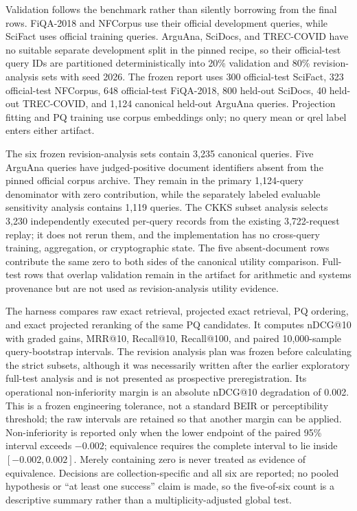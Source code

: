 \documentclass[pdflatex,sn-basic,Numbered]{sn-jnl}
\theoremstyle{plain}
\begin{document}
Validation follows the benchmark rather than silently borrowing from the final rows. FiQA-2018 and NFCorpus use their official development queries, while SciFact uses official training queries. ArguAna, SciDocs, and TREC-COVID have no suitable separate development split in the pinned recipe, so their official-test query IDs are partitioned deterministically into 20\% validation and 80\% revision-analysis sets with seed 2026. The frozen report uses 300 official-test SciFact, 323 official-test NFCorpus, 648 official-test FiQA-2018, 800 held-out SciDocs, 40 held-out TREC-COVID, and 1,124 canonical held-out ArguAna queries. Projection fitting and PQ training use corpus embeddings only; no query mean or qrel label enters either artifact.

The six frozen revision-analysis sets contain 3,235 canonical queries. Five ArguAna queries have judged-positive document identifiers absent from the pinned official corpus archive. They remain in the primary 1,124-query denominator with zero contribution, while the separately labeled evaluable sensitivity analysis contains 1,119 queries. The CKKS subset analysis selects 3,230 independently executed per-query records from the existing 3,722-request replay; it does not rerun them, and the implementation has no cross-query training, aggregation, or cryptographic state. The five absent-document rows contribute the same zero to both sides of the canonical utility comparison. Full-test rows that overlap validation remain in the artifact for arithmetic and systems provenance but are not used as revision-analysis utility evidence.

The harness compares raw exact retrieval, projected exact retrieval, PQ ordering, and exact projected reranking of the same PQ candidates. It computes nDCG@10 with graded gains, MRR@10, Recall@10, Recall@100, and paired 10,000-sample query-bootstrap intervals. The revision analysis plan was frozen before calculating the strict subsets, although it was necessarily written after the earlier exploratory full-test analysis and is not presented as prospective preregistration. Its operational non-inferiority margin is an absolute nDCG@10 degradation of 0.002. This is a frozen engineering tolerance, not a standard BEIR or perceptibility threshold; the raw intervals are retained so that another margin can be applied. Non-inferiority is reported only when the lower endpoint of the paired 95\% interval exceeds $-0.002$; equivalence requires the complete interval to lie inside $[-0.002,0.002]$. Merely containing zero is never treated as evidence of equivalence. Decisions are collection-specific and all six are reported; no pooled hypothesis or ``at least one success'' claim is made, so the five-of-six count is a descriptive summary rather than a multiplicity-adjusted global test.
\end{document}
